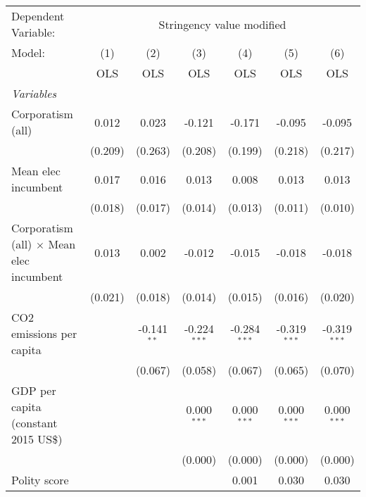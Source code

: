 
\begingroup
\centering
\begin{tabular}{lcccccc}
   \toprule
   Dependent Variable: & \multicolumn{6}{c}{Stringency value modified}\\
   Model:                                          & (1)     & (2)           & (3)            & (4)            & (5)            & (6)\\  
                                                   &  OLS    & OLS           & OLS            & OLS            & OLS            & OLS\\  
   \midrule
   \emph{Variables}\\
   Corporatism (all)                               & 0.012   & 0.023         & -0.121         & -0.171         & -0.095         & -0.095\\   
                                                   & (0.209) & (0.263)       & (0.208)        & (0.199)        & (0.218)        & (0.217)\\   
   Mean elec incumbent                             & 0.017   & 0.016         & 0.013          & 0.008          & 0.013          & 0.013\\   
                                                   & (0.018) & (0.017)       & (0.014)        & (0.013)        & (0.011)        & (0.010)\\   
   Corporatism (all) $\times$ Mean elec incumbent  & 0.013   & 0.002         & -0.012         & -0.015         & -0.018         & -0.018\\   
                                                   & (0.021) & (0.018)       & (0.014)        & (0.015)        & (0.016)        & (0.020)\\   
   CO2 emissions per capita                        &         & -0.141$^{**}$ & -0.224$^{***}$ & -0.284$^{***}$ & -0.319$^{***}$ & -0.319$^{***}$\\   
                                                   &         & (0.067)       & (0.058)        & (0.067)        & (0.065)        & (0.070)\\   
   GDP per capita (constant 2015 US\$)             &         &               & 0.000$^{***}$  & 0.000$^{***}$  & 0.000$^{***}$  & 0.000$^{***}$\\   
                                                   &         &               & (0.000)        & (0.000)        & (0.000)        & (0.000)\\   
   Polity score                                    &         &               &                & 0.001          & 0.030          & 0.030\\   

\end{tabular}
